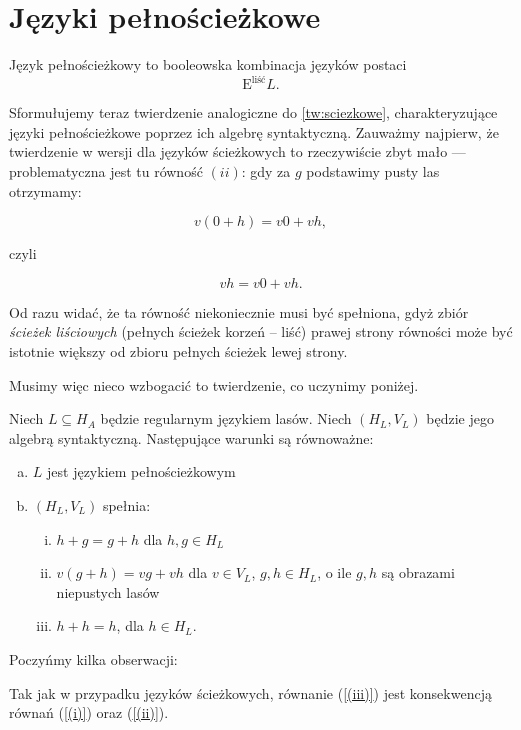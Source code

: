 \section{Języki pełnościeżkowe}

\begin{definicja}
	Język pełnościeżkowy to booleowska kombinacja języków postaci
	$$\mathrm{E}^{\textrm{liść}}L.$$
\end{definicja}

Sformułujemy teraz twierdzenie analogiczne do \ref{tw:sciezkowe}, charakteryzujące języki pełnościeżkowe poprzez ich algebrę syntaktyczną. Zauważmy najpierw, że twierdzenie w wersji dla języków ścieżkowych to rzeczywiście zbyt mało --- problematyczna jest tu równość $(ii)$: gdy za $g$ podstawimy pusty las otrzymamy:

$$v(0+h) = v0 + vh,$$

czyli

$$vh = v0 + vh.$$

Od razu widać, że ta równość niekoniecznie musi być spełniona, gdyż zbiór \textit{ścieżek liściowych} (pełnych ścieżek korzeń -- liść) prawej strony równości może być istotnie większy od zbioru pełnych ścieżek lewej strony.

Musimy więc nieco wzbogacić to twierdzenie, co uczynimy poniżej.

\begin{twierdzenie}
	Niech $L \subseteq H_A$ będzie regularnym językiem lasów. Niech $(H_L, V_L)$ będzie jego algebrą syntaktyczną. Następujące warunki są równoważne:
	
	\begin{enumerate}[(a)]
		\item $L$ jest językiem pełnościeżkowym
		\item $(H_L, V_L)$ spełnia:
		\begin{enumerate}[(i)]
			\item $h + g = g + h$ dla $h,g \in H_L$\label{(i)}
			\item $v(g+h) = vg + vh$ dla $v \in V_L$, $g,h \in H_L$, o ile $g,h$ są obrazami niepustych lasów\label{(ii)}
			\item $h + h = h$, dla $h \in H_L$.\label{(iii)}
		\end{enumerate}
	\end{enumerate}
\end{twierdzenie}

Poczyńmy kilka obserwacji:

\begin{fakt}
	Tak jak w przypadku języków ścieżkowych, równanie (\ref{(iii)}) jest konsekwencją równań (\ref{(i)}) oraz (\ref{(ii)}).
\end{fakt}

